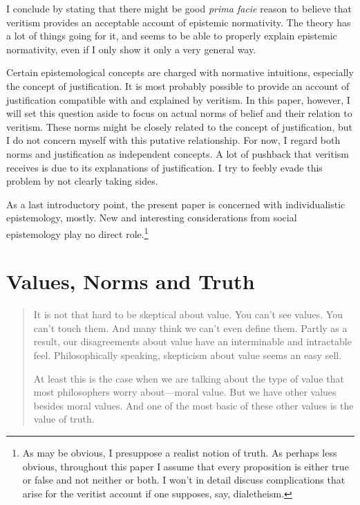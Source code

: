 \documentclass[12pt,numbers=noenddot]{scrartcl}
\begin{document}
I conclude by stating that there might be good \emph{prima facie} reason to believe that veritism provides an acceptable account of epistemic normativity. The theory has a lot of things going for it, and seems to be able to properly explain epistemic normativity, even if I only show it only a very general way.

Certain epistemological concepts are charged with normative intuitions, especially the concept of justification. It is most probably possible to provide an account of justification compatible with and explained by veritism. In this paper, however, I will set this question aside to focus on actual norms of belief and their relation to veritism. These norms might be closely related to the concept of justification, but I do not concern myself with this putative relationship. For now, I regard both norms and justification as independent concepts. A lot of pushback that veritism receives is due to its explanations of justification. I try to feebly evade this problem by not clearly taking sides.

As a last introductory point, the present paper is concerned with individualistic epistemology, mostly. New and interesting considerations from social epistemology play no direct role.\footnote{As may be obvious, I presuppose a realist notion of truth. As perhaps less obvious, throughout this paper I assume that every proposition is either true or false and not neither or both. I won't in detail discuss complications that arise for the veritist account if one supposes, say, dialetheism.}

\clearpage

\section{Values, Norms and Truth}\label{sec:values}

\begin{quote}
    It is not that hard to be skeptical about value. You can't see values. You can't touch them. And many think we can't even define them. Partly as a result, our disagreements about value have an interminable and intractable feel. Philosophically speaking, skepticism about value seems an easy sell.

    At least this is the case when we are talking about the type of value that most philosophers worry about—moral value. But we have other values besides moral values. And one of the most basic of these other values is the value of truth. \autocite[225]{Lynch2009}
\end{quote}
\end{document}
